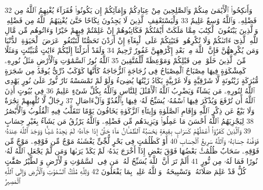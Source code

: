 {\tiny\colorbox{cl_aya}{32}} وَأَنكِحُوا۟ ٱلْأَيَٰمَىٰ مِنكُمْ وَٱلصَّٰلِحِينَ مِنْ عِبَادِكُمْ وَإِمَآئِكُمْ إِن يَكُونُوا۟ فُقَرَآءَ يُغْنِهِمُ ٱللَّهُ مِن فَضْلِهِۦ وَٱللَّهُ وَٰسِعٌ عَلِيمٌ
{\tiny\colorbox{cl_aya}{33}} وَلْيَسْتَعْفِفِ ٱلَّذِينَ لَا يَجِدُونَ نِكَاحًا حَتَّىٰ يُغْنِيَهُمُ ٱللَّهُ مِن فَضْلِهِۦ وَٱلَّذِينَ يَبْتَغُونَ ٱلْكِتَٰبَ مِمَّا مَلَكَتْ أَيْمَٰنُكُمْ فَكَاتِبُوهُمْ إِنْ عَلِمْتُمْ فِيهِمْ خَيْرًا وَءَاتُوهُم مِّن مَّالِ ٱللَّهِ ٱلَّذِىٓ ءَاتَىٰكُمْ وَلَا تُكْرِهُوا۟ فَتَيَٰتِكُمْ عَلَى ٱلْبِغَآءِ إِنْ أَرَدْنَ تَحَصُّنًا لِّتَبْتَغُوا۟ عَرَضَ ٱلْحَيَوٰةِ ٱلدُّنْيَا وَمَن يُكْرِههُّنَّ فَإِنَّ ٱللَّهَ مِنۢ بَعْدِ إِكْرَٰهِهِنَّ غَفُورٌ رَّحِيمٌ
{\tiny\colorbox{cl_aya}{34}} وَلَقَدْ أَنزَلْنَآ إِلَيْكُمْ ءَايَٰتٍ مُّبَيِّنَٰتٍ وَمَثَلًا مِّنَ ٱلَّذِينَ خَلَوْا۟ مِن قَبْلِكُمْ وَمَوْعِظَةً لِّلْمُتَّقِينَ
{\tiny\colorbox{cl_aya}{35}} ٱللَّهُ نُورُ ٱلسَّمَٰوَٰتِ وَٱلْأَرْضِ مَثَلُ نُورِهِۦ كَمِشْكَوٰةٍ فِيهَا مِصْبَاحٌ ٱلْمِصْبَاحُ فِى زُجَاجَةٍ ٱلزُّجَاجَةُ كَأَنَّهَا كَوْكَبٌ دُرِّىٌّ يُوقَدُ مِن شَجَرَةٍ مُّبَٰرَكَةٍ زَيْتُونَةٍ لَّا شَرْقِيَّةٍ وَلَا غَرْبِيَّةٍ يَكَادُ زَيْتُهَا يُضِىٓءُ وَلَوْ لَمْ تَمْسَسْهُ نَارٌ نُّورٌ عَلَىٰ نُورٍ يَهْدِى ٱللَّهُ لِنُورِهِۦ مَن يَشَآءُ وَيَضْرِبُ ٱللَّهُ ٱلْأَمْثَٰلَ لِلنَّاسِ وَٱللَّهُ بِكُلِّ شَىْءٍ عَلِيمٌ
{\tiny\colorbox{cl_aya}{36}} فِى بُيُوتٍ أَذِنَ ٱللَّهُ أَن تُرْفَعَ وَيُذْكَرَ فِيهَا ٱسْمُهُۥ يُسَبِّحُ لَهُۥ فِيهَا بِٱلْغُدُوِّ وَٱلْءَاصَالِ
{\tiny\colorbox{cl_aya}{37}} رِجَالٌ لَّا تُلْهِيهِمْ تِجَٰرَةٌ وَلَا بَيْعٌ عَن ذِكْرِ ٱللَّهِ وَإِقَامِ ٱلصَّلَوٰةِ وَإِيتَآءِ ٱلزَّكَوٰةِ يَخَافُونَ يَوْمًا تَتَقَلَّبُ فِيهِ ٱلْقُلُوبُ وَٱلْأَبْصَٰرُ
{\tiny\colorbox{cl_aya}{38}} لِيَجْزِيَهُمُ ٱللَّهُ أَحْسَنَ مَا عَمِلُوا۟ وَيَزِيدَهُم مِّن فَضْلِهِۦ وَٱللَّهُ يَرْزُقُ مَن يَشَآءُ بِغَيْرِ حِسَابٍ
{\tiny\colorbox{cl_aya}{39}} وَٱلَّذِينَ كَفَرُوٓا۟ أَعْمَٰلُهُمْ كَسَرَابٍۭ بِقِيعَةٍ يَحْسَبُهُ ٱلظَّمْـَٔانُ مَآءً حَتَّىٰٓ إِذَا جَآءَهُۥ لَمْ يَجِدْهُ شَيْـًٔا وَوَجَدَ ٱللَّهَ عِندَهُۥ فَوَفَّىٰهُ حِسَابَهُۥ وَٱللَّهُ سَرِيعُ ٱلْحِسَابِ
{\tiny\colorbox{cl_aya}{40}} أَوْ كَظُلُمَٰتٍ فِى بَحْرٍ لُّجِّىٍّ يَغْشَىٰهُ مَوْجٌ مِّن فَوْقِهِۦ مَوْجٌ مِّن فَوْقِهِۦ سَحَابٌ ظُلُمَٰتٌۢ بَعْضُهَا فَوْقَ بَعْضٍ إِذَآ أَخْرَجَ يَدَهُۥ لَمْ يَكَدْ يَرَىٰهَا وَمَن لَّمْ يَجْعَلِ ٱللَّهُ لَهُۥ نُورًا فَمَا لَهُۥ مِن نُّورٍ
{\tiny\colorbox{cl_aya}{41}} أَلَمْ تَرَ أَنَّ ٱللَّهَ يُسَبِّحُ لَهُۥ مَن فِى ٱلسَّمَٰوَٰتِ وَٱلْأَرْضِ وَٱلطَّيْرُ صَٰٓفَّٰتٍ كُلٌّ قَدْ عَلِمَ صَلَاتَهُۥ وَتَسْبِيحَهُۥ وَٱللَّهُ عَلِيمٌۢ بِمَا يَفْعَلُونَ
{\tiny\colorbox{cl_aya}{42}} وَلِلَّهِ مُلْكُ ٱلسَّمَٰوَٰتِ وَٱلْأَرْضِ وَإِلَى ٱللَّهِ ٱلْمَصِيرُ
